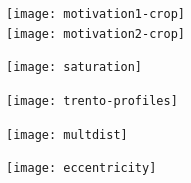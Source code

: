 \documentclass[aps,prc,reprint,amsmath,nofootinbib]{revtex4-1}
\begin{document}
\begin{figure}
 \texttt{[image: motivation1-crop]}\\
 \texttt{[image: motivation2-crop]}
\end{figure}

\begin{figure}
 \texttt{[image: saturation]}
\end{figure}

\begin{figure}
 \texttt{[image: trento-profiles]}
\end{figure}

\begin{figure}
 \texttt{[image: multdist]}
\end{figure}

\begin{figure}
 \texttt{[image: eccentricity]}
\end{figure}


\end{document}
